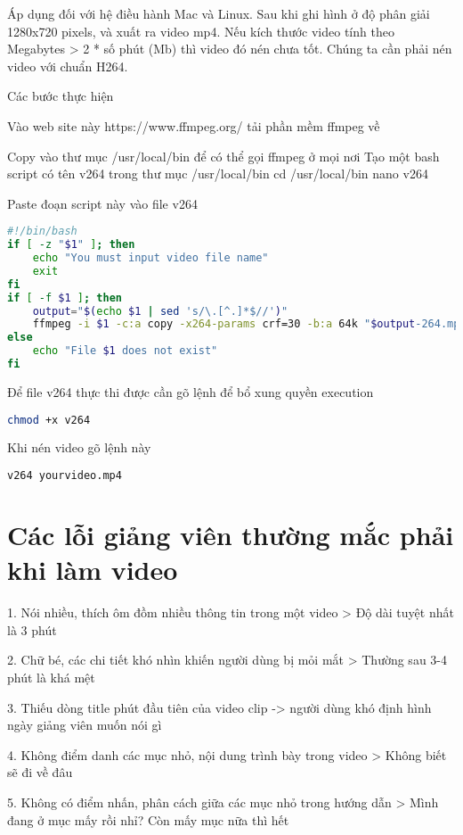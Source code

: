 Áp dụng đối với hệ điều hành Mac và Linux. Sau khi ghi hình ở độ phân giải 1280x720 pixels, và xuất ra video mp4. Nếu kích thước video tính theo Megabytes > 2 * số phút (Mb) thì video đó nén chưa tốt. Chúng ta cần phải nén video với chuẩn H264.

Các bước thực hiện

Vào web site này https://www.ffmpeg.org/ tải phần mềm ffmpeg về

Copy vào thư mục /usr/local/bin để có thể gọi ffmpeg ở mọi nơi
Tạo một bash script có tên v264 trong thư mục /usr/local/bin
cd /usr/local/bin
nano v264

Paste đoạn script này vào file v264

\begin{lstlisting}[language=bash]
#!/bin/bash
if [ -z "$1" ]; then
    echo "You must input video file name"
    exit
fi
if [ -f $1 ]; then
	output="$(echo $1 | sed 's/\.[^.]*$//')"
	ffmpeg -i $1 -c:a copy -x264-params crf=30 -b:a 64k "$output-264.mp4"
else
	echo "File $1 does not exist"
fi
\end{lstlisting}

Để file v264 thực thi được cần gõ lệnh để bổ xung quyền execution

\begin{lstlisting}[language=bash]
chmod +x v264
\end{lstlisting}

Khi nén video gõ lệnh này

\begin{lstlisting}[language=bash]
v264 yourvideo.mp4
\end{lstlisting}

\section{Các lỗi giảng viên thường mắc phải khi làm video}

1. Nói nhiều, thích ôm đồm nhiều thông tin trong một video > Độ dài tuyệt nhất là 3 phút

2. Chữ bé, các chi tiết khó nhìn khiến người dùng bị mỏi mắt > Thường sau 3-4 phút là khá mệt

3. Thiếu dòng title phút đầu tiên của video clip -> người dùng khó định hình ngày giảng viên muốn nói gì

4. Không điểm danh các mục nhỏ, nội dung trình bày trong video > Không biết sẽ đi về đâu

5. Không có điểm nhấn, phân cách giữa các mục nhỏ trong hướng dẫn > Mình đang ở mục mấy rồi nhỉ? Còn mấy mục nữa thì hết

